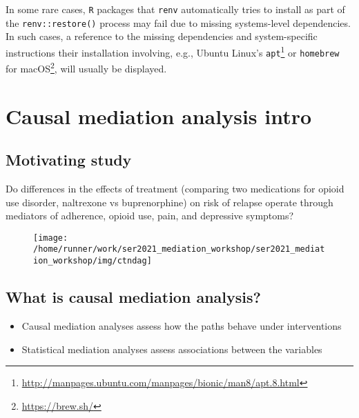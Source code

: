\documentclass[
  12pt,
]{book}
\newcommand{\passthrough}[1]{#1}
\providecommand{\tightlist}{%
  \setlength{\itemsep}{0pt}\setlength{\parskip}{0pt}}
\renewcommand{\href}[2]{#2\footnote{\url{#1}}}
\theoremstyle{definition}
\theoremstyle{definition}
\theoremstyle{definition}
\newcommand{\1}{\mathbbm{1}}
\begin{document}
In some rare cases, \passthrough{\lstinline!R!} packages that \passthrough{\lstinline!renv!} automatically tries to install as
part of the \passthrough{\lstinline!renv::restore()!} process may fail due to missing systems-level
dependencies. In such cases, a reference to the missing dependencies and
system-specific instructions their installation involving, e.g., \href{http://manpages.ubuntu.com/manpages/bionic/man8/apt.8.html}{Ubuntu
Linux's \passthrough{\lstinline!apt!}} or
\href{https://brew.sh/}{\passthrough{\lstinline!homebrew!} for macOS}, will usually be displayed.

\hypertarget{mediation}{%
\chapter{Causal mediation analysis intro}\label{mediation}}

\hypertarget{motivating-study}{%
\section{Motivating study}\label{motivating-study}}

Do differences in the effects of treatment (comparing two medications for opioid
use disorder, naltrexone vs buprenorphine) on risk of relapse operate through
mediators of adherence, opioid use, pain, and depressive symptoms?
\citep{rudolph2020explaining}

\begin{figure}

{\centering \texttt{[image: /home/runner/work/ser2021\_mediation\_workshop/ser2021\_mediation\_workshop/img/ctndag]} 

}

\end{figure}

\hypertarget{what-is-causal-mediation-analysis}{%
\section{What is causal mediation analysis?}\label{what-is-causal-mediation-analysis}}

\begin{itemize}
\tightlist
\item
  Causal mediation analyses assess how the paths behave under interventions
\item
  Statistical mediation analyses assess associations between the variables
\end{itemize}
\end{document}
